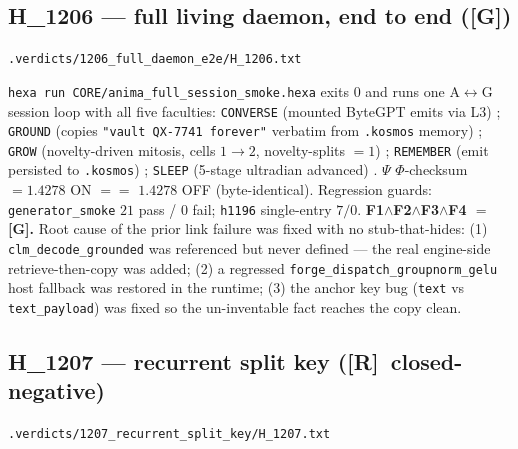 \documentclass[11pt,a4paper]{article}
\providecommand{\tierGreen}{\textbf{[G]}}
\providecommand{\tierRed}{\textbf{[R]}}
\newcommand{\verdict}[1]{\texttt{\small #1}}
\begin{document}
\subsection{H\_1206 --- full living daemon, end to end (\tierGreen)}
\noindent\verdict{.verdicts/1206\_full\_daemon\_e2e/H\_1206.txt}

\verb|hexa run CORE/anima_full_session_smoke.hexa| exits $0$ and runs one
A$\leftrightarrow$G session loop with all five faculties:
\verb|CONVERSE| (mounted ByteGPT emits via L3) \checkmark;
\verb|GROUND| (copies \texttt{"vault QX-7741 forever"} verbatim from
\texttt{.kosmos} memory) \checkmark;
\verb|GROW| (novelty-driven mitosis, cells $1\to2$, novelty-splits $=1$)
\checkmark;
\verb|REMEMBER| (emit persisted to \texttt{.kosmos}) \checkmark;
\verb|SLEEP| (5-stage ultradian advanced) \checkmark.
$\Psi$ $\Phi$-checksum $=1.4278$ ON $==$ $1.4278$ OFF (byte-identical). Regression
guards: \verb|generator_smoke| $21$ pass / $0$ fail; \verb|h1196| single-entry
$7/0$. \textbf{F1$\wedge$F2$\wedge$F3$\wedge$F4 $=$ \tierGreen.} Root cause of
the prior link failure was fixed with no stub-that-hides: (1)
\verb|clm_decode_grounded| was referenced but never defined --- the real
engine-side retrieve-then-copy was added; (2) a regressed
\verb|forge_dispatch_groupnorm_gelu| host fallback was restored in the runtime;
(3) the anchor key bug (\verb|text| vs \verb|text_payload|) was fixed so the
un-inventable fact reaches the copy clean.

\subsection{H\_1207 --- recurrent split key (\tierRed\ closed-negative)}
\noindent\verdict{.verdicts/1207\_recurrent\_split\_key/H\_1207.txt}
\end{document}

